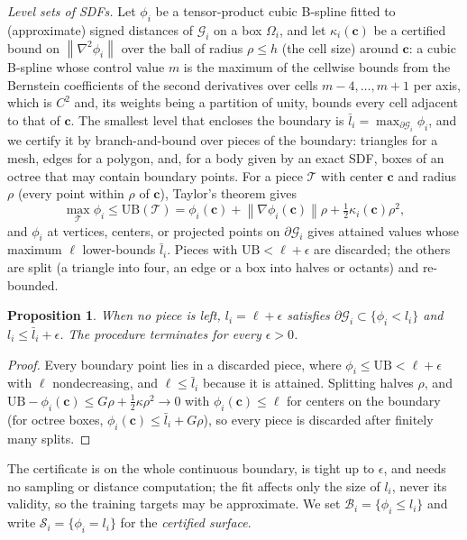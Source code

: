 \documentclass[journal]{IEEEtran}
\newtheorem{proposition}{Proposition}
\theoremstyle{definition}
\newcommand{\norm}[1]{\left\lVert #1\right\rVert}
\begin{document}
\emph{Level sets of SDFs.} Let $\phi_i$ be a tensor-product cubic B-spline fitted to (approximate)
signed distances of $\mathcal G_i$ on a box $\Omega_i$, and let $\kappa_i(\mathbf c)$ be a certified
bound on $\norm{\nabla^2\phi_i}$ over the ball of radius $\rho\le h$ (the cell size) around $\mathbf c$: a
cubic B-spline whose control value $m$ is the maximum of the cellwise bounds from the Bernstein
coefficients of the second derivatives over cells $m-4,\dots,m+1$ per axis, which is $C^2$ and, its
weights being a partition of unity, bounds every cell adjacent to that of $\mathbf c$. The smallest level that encloses the boundary is
$\bar l_i=\max_{\partial\mathcal G_i}\phi_i$, and we certify it by branch-and-bound over pieces of the
boundary: triangles for a mesh, edges for a polygon, and, for a body given by an exact SDF, boxes of an
octree that may contain boundary points. For a piece $\mathcal T$ with center $\mathbf c$ and radius
$\rho$ (every point within $\rho$ of $\mathbf c$), Taylor's theorem gives
\begin{equation}\label{eq:level-ub}
\max_{\mathcal T}\phi_i\le\mathrm{UB}(\mathcal T)=\phi_i(\mathbf c)+\norm{\nabla\phi_i(\mathbf c)}\rho
+\tfrac12\kappa_i(\mathbf c)\rho^2 ,
\end{equation}
and $\phi_i$ at vertices, centers, or projected points on $\partial\mathcal G_i$ gives attained values
whose maximum $\ell$ lower-bounds $\bar l_i$. Pieces with $\mathrm{UB}<\ell+\epsilon$ are discarded;
the others are split (a triangle into four, an edge or a box into halves or octants) and re-bounded.
\begin{proposition}\label{prop:level}
When no piece is left, $l_i=\ell+\epsilon$ satisfies $\partial\mathcal G_i\subset\{\phi_i<l_i\}$ and
$l_i\le\bar l_i+\epsilon$. The procedure terminates for every $\epsilon>0$.
\end{proposition}
\begin{proof}
Every boundary point lies in a discarded piece, where $\phi_i\le\mathrm{UB}<\ell+\epsilon$ with $\ell$
nondecreasing, and $\ell\le\bar l_i$ because it is attained. Splitting halves $\rho$, and
$\mathrm{UB}-\phi_i(\mathbf c)\le G\rho+\tfrac12\kappa\rho^2\to0$ with $\phi_i(\mathbf c)\le\ell$ for
centers on the boundary (for octree boxes, $\phi_i(\mathbf c)\le\bar l_i+G\rho$), so every piece is
discarded after finitely many splits.
\end{proof}
The certificate is on the whole continuous boundary, is tight up to $\epsilon$, and needs no
sampling or distance computation; the fit affects only the size of $l_i$, never its validity, so the
training targets may be approximate. We set $\mathcal B_i=\{\phi_i\le l_i\}$ and write
$\mathcal S_i=\{\phi_i=l_i\}$ for the \emph{certified surface}.
\end{document}
